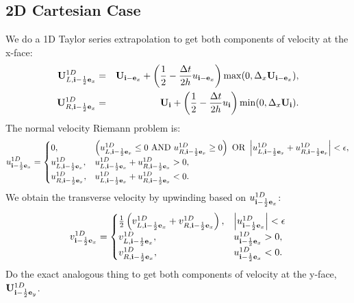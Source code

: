 \documentclass[11pt]{article}
\def\half  {\frac{1}{2}}
\def\dt    {\Delta t}
\def\eb    {{\bf e}}
\def\ib    {{\bf i}}
\def\Ub    {{\bf U}}
\begin{document}
\subsection{2D Cartesian Case}
We do a 1D Taylor series extrapolation to get both components of velocity at the x-face:
\begin{eqnarray}
\Ub_{L,\ib-\half\eb_x}^{1D} &=& \Ub_{\ib-\eb_x} + \left(\half - \frac{\dt}{2h}u_{\ib-\eb_x}\right){\rm max}(0,\Delta_x\Ub_{\ib-\eb_x}), \\
\Ub_{R,\ib-\half\eb_x}^{1D} &=& \Ub_{\ib} + \left(\half - \frac{\dt}{2h}u_{\ib}\right){\rm min}(0,\Delta_x\Ub_{\ib}).
\end{eqnarray}
The normal velocity Riemann problem is:
\begin{equation}
u_{\ib-\half\eb_x}^{1D} =
\begin{cases}
0, & \left(u_{L,\ib-\half\eb_x}^{1D} \le 0 ~ {\rm AND} ~ u_{R,\ib-\half\eb_x}^{1D} \ge 0\right) ~ {\rm OR} ~ \left|u_{L,\ib-\half\eb_x}^{1D} + u_{R,\ib-\half\eb_x}^{1D}\right| < \epsilon, \\
u_{L,\ib-\half\eb_x}^{1D}, & u_{L,\ib-\half\eb_x}^{1D} + u_{R,\ib-\half\eb_x}^{1D} > 0, \\
u_{R,\ib-\half\eb_x}^{1D}, & u_{L,\ib-\half\eb_x}^{1D} + u_{R,\ib-\half\eb_x}^{1D} < 0.
\end{cases}
\end{equation}
We obtain the transverse velocity by upwinding based on $u_{\ib-\half\eb_x}^{1D}$:
\begin{equation}
v_{\ib-\half\eb_x}^{1D} =
\begin{cases}
\half\left(v_{L,\ib-\half\eb_x}^{1D} + v_{R,\ib-\half\eb_x}^{1D}\right), & \left|u_{\ib-\half\eb_x}^{1D}\right| < \epsilon \\
v_{L,\ib-\half\eb_x}^{1D}, & u_{\ib-\half\eb_x}^{1D} > 0, \\
v_{R,\ib-\half\eb_x}^{1D}, & u_{\ib-\half\eb_x}^{1D} < 0.
\end{cases}
\end{equation}
Do the exact analogous thing to get both components of velocity at the y-face, $\Ub_{\ib-\half\eb_y}^{1D}$. \\
\end{document}
